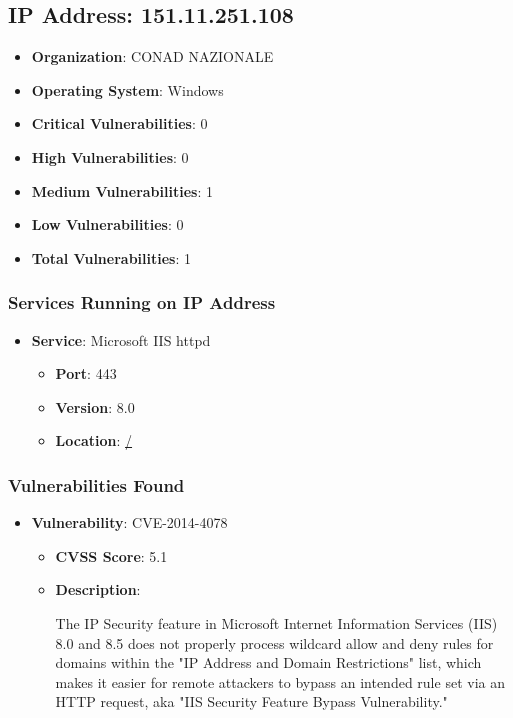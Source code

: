 \documentclass{article}
\begin{document}
\clearpage



\subsection{IP Address: 151.11.251.108}

\begin{itemize}
    \item \textbf{Organization}: CONAD NAZIONALE
    \item \textbf{Operating System}:  Windows 
    \item \textbf{Critical Vulnerabilities}: 0
    \item \textbf{High Vulnerabilities}: 0
    \item \textbf{Medium Vulnerabilities}: 1
    \item \textbf{Low Vulnerabilities}: 0
    \item \textbf{Total Vulnerabilities}: 1
\end{itemize}

\subsubsection*{Services Running on IP Address}

\begin{itemize}
    
        \item \textbf{Service}: Microsoft IIS httpd
        \begin{itemize}
            \item \textbf{Port}: 443
            \item \textbf{Version}:  8.0 
            \item \textbf{Location}: \href{ / }{ / }
        \end{itemize}
    
\end{itemize}


\subsubsection*{Vulnerabilities Found}

\begin{itemize}
    
        \item \textbf{Vulnerability}: CVE-2014-4078
        \begin{itemize}
            \item \textbf{CVSS Score}:  5.1 
            \item \textbf{Description}:
            \parbox[t]{0.9\linewidth}{
                \ttfamily The IP Security feature in Microsoft Internet Information Services (IIS) 8.0 and 8.5 does not properly process wildcard allow and deny rules for domains within the "IP Address and Domain Restrictions" list, which makes it easier for remote attackers to bypass an intended rule set via an HTTP request, aka "IIS Security Feature Bypass Vulnerability."
            }
        \end{itemize}
    
\end{itemize}
\end{document}
